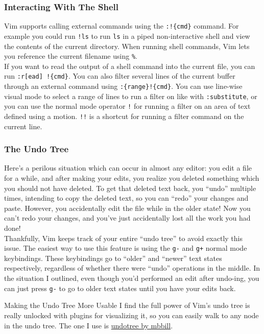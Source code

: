 \documentclass{beamer}
\begin{document}
\begin{frame}[fragile]
	\frametitle{Interacting With The Shell}
	\small
	Vim supports calling external commands using the \verb+:!{cmd}+ command. For example you could run \verb+!ls+ to run \verb+ls+ in a piped non-interactive shell and view the contents of the current directory. When running shell commands, Vim lets you reference the current filename using \verb+%+.\\
	\vspace{0.5cm}
	If you want to read the output of a shell command into the current file, you can run \verb+:r[ead] !{cmd}+. You can also filter several lines of the current buffer through an external command using \verb+:{range}!{cmd}+. You can use line-wise visual mode to select a range of lines to run a filter on like with \verb+:substitute+, or you can use the normal mode operator \verb+!+ for running a filter on an area of text defined using a motion. \verb+!!+ is a shortcut for running a filter command on the current line.

\end{frame}

\begin{frame}[fragile]
    \frametitle{The Undo Tree}
    \small
	Here's a perilous situation which can occur in almost any editor: you edit a file for a while, and after making your edits, you realize you deleted something which you should not have deleted. To get that deleted text back, you \enquote{undo} multiple times, intending to copy the deleted text, so you can \enquote{redo} your changes and paste. However, you accidentally edit the file while in the older state! Now you can't redo your changes, and you've just accidentally lost all the work you had done!\\
	\vspace{0.5cm}
	Thankfully, Vim keeps track of your entire \enquote{undo tree} to avoid exactly this issue. The easiest way to use this feature is using the \verb+g-+ and \verb|g+| normal mode keybindings. These keybindings go to \enquote{older} and \enquote{newer} text states respectively, regardless of whether there were \enquote{undo} operations in the middle. In the situation I outlined, even though you'd performed an edit after undo-ing, you can just press \verb+g-+ to go to older text states until you have your edits back.
\end{frame}

\begin{frame}
	\begin{block}{Making the Undo Tree More Usable}
		I find the full power of Vim's undo tree is really unlocked with plugins for visualizing it, so you can easily walk to any node in the undo tree. The one I use is \href{https://github.com/mbbill/undotree}{undotree by mbbill}.
	\end{block}
\end{frame}
\end{document}
